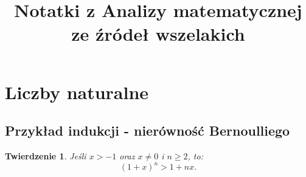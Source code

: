 \documentclass[a4paper,oneside,openright,11pt]{article}
\title{Notatki z Analizy matematycznej ze źródeł wszelakich}
\author{}
\date{}
\newtheorem{theorem}{Twierdzenie}
\numberwithin{equation}{section}
\begin{document}
\begin{titlepage}
\maketitle
\end{titlepage}



\tableofcontents

\section{Liczby naturalne}

\subsection{Przykład indukcji - nierówność Bernoulliego}

\begin{theorem}
    Jeśli $x > -1$ oraz $x \neq 0$ i $n \geq 2$, to:
    \begin{equation*}
        (1 + x)^{n} > 1 + nx.
    \end{equation*}
\end{theorem}
\end{document}
